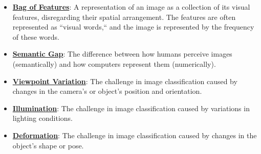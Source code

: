 \documentclass{article}%
\begin{document}
\begin{itemize}[leftmargin=*]%
\item \href{https://purdue.brightspace.com/d2l/common/assets/pdfjs-d2l-dist/1.0.14-legacy/web/viewer.html?file=\%2Fcontent\%2Fenforced\%2F1095467-wl.202510.CS.24300.001\%2F07L2-Vision.pdf\%3Fou\%3D1095467\&lang=en-us\&container=d2l-fileviewer-rendered-pdf\&fullscreen=d2l-fileviewer-rendered-pdf-dialog\&height=667#page=12}{\textbf{Bag of Features}}: A representation of an image as a collection of its visual features, disregarding their spatial arrangement. The features are often represented as ``visual words,`` and the image is represented by the frequency of these words.%
\item \href{https://purdue.brightspace.com/d2l/common/assets/pdfjs-d2l-dist/1.0.14-legacy/web/viewer.html?file=\%2Fcontent\%2Fenforced\%2F1095467-wl.202510.CS.24300.001\%2F07L2-Vision.pdf\%3Fou\%3D1095467\&lang=en-us\&container=d2l-fileviewer-rendered-pdf\&fullscreen=d2l-fileviewer-rendered-pdf-dialog\&height=667#page=4}{\textbf{Semantic Gap}}: The difference between how humans perceive images (semantically) and how computers represent them (numerically).%
\item \href{https://purdue.brightspace.com/d2l/common/assets/pdfjs-d2l-dist/1.0.14-legacy/web/viewer.html?file=\%2Fcontent\%2Fenforced\%2F1095467-wl.202510.CS.24300.001\%2F07L2-Vision.pdf\%3Fou\%3D1095467\&lang=en-us\&container=d2l-fileviewer-rendered-pdf\&fullscreen=d2l-fileviewer-rendered-pdf-dialog\&height=667#page=6}{\textbf{Viewpoint Variation}}: The challenge in image classification caused by changes in the camera's or object's position and orientation.%
\item \href{https://purdue.brightspace.com/d2l/common/assets/pdfjs-d2l-dist/1.0.14-legacy/web/viewer.html?file=\%2Fcontent\%2Fenforced\%2F1095467-wl.202510.CS.24300.001\%2F07L2-Vision.pdf\%3Fou\%3D1095467\&lang=en-us\&container=d2l-fileviewer-rendered-pdf\&fullscreen=d2l-fileviewer-rendered-pdf-dialog\&height=667#page=7}{\textbf{Illumination}}: The challenge in image classification caused by variations in lighting conditions.%
\item \href{https://purdue.brightspace.com/d2l/common/assets/pdfjs-d2l-dist/1.0.14-legacy/web/viewer.html?file=\%2Fcontent\%2Fenforced\%2F1095467-wl.202510.CS.24300.001\%2F07L2-Vision.pdf\%3Fou\%3D1095467\&lang=en-us\&container=d2l-fileviewer-rendered-pdf\&fullscreen=d2l-fileviewer-rendered-pdf-dialog\&height=667#page=8}{\textbf{Deformation}}: The challenge in image classification caused by changes in the object's shape or pose.%

\end{itemize}
\end{document}
